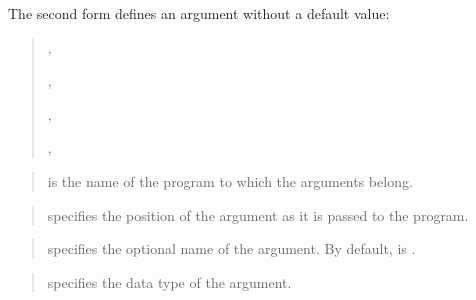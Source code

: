 \documentclass[letterpaper,10pt,english,openany,oneside]{sphinxmanual}
\begin{document}
The second form defines an argument without a default value:
\begin{quote}

\begin{DUlineblock}{0em}
\item[] 
\item[] ,
\item[] ,
\item[] ,
\item[] ,
\item[] 
\end{DUlineblock}
\end{quote}


\begin{quote}

 is the name of the program to which the arguments
belong.
\end{quote}

\begin{quote}

 specifies the position of the argument as it is
passed to the program.
\end{quote}

\begin{quote}

 specifies the optional name of the argument. By
default,  is .
\end{quote}

\begin{quote}

 specifies the data type of the argument.
\end{quote}
\end{document}
